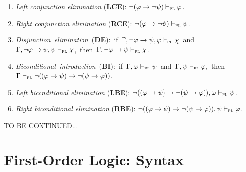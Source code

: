 \documentclass[a4paper, 11pt]{article} %
\begin{document}
\begin{enumerate}[itemsep=2pt]
  \item \textit{Left conjunction elimination} (\textbf{LCE}): $\neg(\varphi \rightarrow \neg\psi) \vdash_{\textsc{pl}} \varphi$. 
  \item \textit{Right conjunction elimination} (\textbf{RCE}): $\neg(\varphi \rightarrow \neg\psi) \vdash_{\textsc{pl}} \psi$. 
  \item \mbox{\textit{Disjunction elimination} (\textbf{DE}): if $\Gamma, \neg\varphi \rightarrow \psi, \varphi \vdash_{\textsc{pl}} \chi$ and $\Gamma, \neg\varphi \rightarrow \psi, \psi \vdash_{\textsc{pl}} \chi$, then $\Gamma, \neg\varphi \rightarrow \psi \vdash_{\textsc{pl}} \chi$.} 
  \item \mbox{\textit{Biconditional introduction} (\textbf{BI}): if $\Gamma, \varphi \vdash_{\textsc{pl}} \psi$ and $\Gamma, \psi \vdash_{\textsc{pl}} \varphi$, then $\Gamma \vdash_{\textsc{pl}} \neg((\varphi \rightarrow \psi) \rightarrow \neg(\psi \rightarrow \varphi))$.} 
  \item \textit{Left biconditional elimination} (\textbf{LBE}): $\neg((\varphi \rightarrow \psi) \rightarrow \neg(\psi \rightarrow \varphi)), \varphi \vdash_{\textsc{pl}} \psi$.
  \item \textit{Right biconditional elimination} (\textbf{RBE}): $\neg((\varphi \rightarrow \psi) \rightarrow \neg(\psi \rightarrow \varphi)), \psi \vdash_{\textsc{pl}} \varphi$.
\end{enumerate}


\pagebreak
\noindent
TO BE CONTINUED...
\pagebreak





\section*{\sc First-Order Logic: Syntax}
\end{document}
